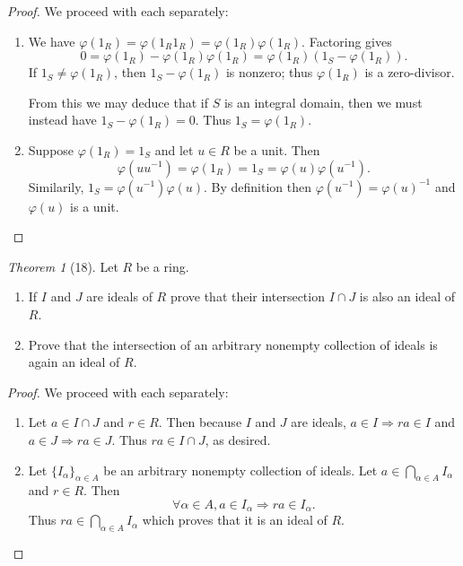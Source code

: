 \documentclass[12pt]{article}
\theoremstyle{remark}
\theoremstyle{named}
\newtheorem*{theorem}{Theorem}
\renewcommand{\a}{\alpha}
\begin{document}
\begin{proof}
    We proceed with each separately:
    \begin{enumerate}
        \item We have \(\varphi(1_R) = \varphi(1_R 1_R) = \varphi(1_R)\varphi(1_R)\). Factoring gives \[0 = \varphi(1_R) - \varphi(1_R)\varphi(1_R) = \varphi(1_R)(1_S - \varphi(1_R)).\] If \(1_S \neq \varphi(1_R)\), then \(1_S - \varphi(1_R)\) is nonzero; thus \(\varphi(1_R)\) is a zero-divisor.
        
        From this we may deduce that if \(S\) is an integral domain, then we must instead have \(1_S - \varphi(1_R) = 0\). Thus \(1_S = \varphi(1_R)\).

        \item Suppose \(\varphi(1_R) = 1_S\) and let \(u \in R\) be a unit. Then \[\varphi(uu^{-1}) = \varphi(1_R) = 1_S = \varphi(u)\varphi(u^{-1}).\]
        Similarily, \(1_S = \varphi(u^{-1})\varphi(u)\). By definition then \(\varphi(u^{-1}) = \varphi(u)^{-1}\) and \(\varphi(u)\) is a unit.  
    \end{enumerate}
\end{proof}


\begin{theorem}[18]
    Let \(R\) be a ring.
    \begin{enumerate}
        \item If \(I\) and \(J\) are ideals of \(R\) prove that their intersection \(I \cap J\) is also an ideal of \(R\). 
        \item Prove that the intersection of an arbitrary nonempty collection of ideals is again an ideal of \(R\). 
    \end{enumerate}
\end{theorem}

\begin{proof}
    We proceed with each separately:
    \begin{enumerate}
        \item Let \(a \in I \cap J\) and \(r \in R\). Then because \(I\) and \(J\) are ideals, \(a \in I \Rightarrow ra \in I\) and \(a \in J \Rightarrow ra \in J\). Thus \(ra \in I \cap J\), as desired.
        \item Let \(\{I_\a\}_{\a \in A}\) be an arbitrary nonempty collection of ideals. Let \(a \in \bigcap_{\a \in A} I_\a\) and \(r \in R\). Then 
        \[\forall \a \in A, a \in I_\a \Rightarrow ra \in I_\a.\] 
        Thus \(ra \in \bigcap_{\a \in A}I_\a\) which proves that it is an ideal of \(R\). 
    \end{enumerate}
\end{proof}
\end{document}
